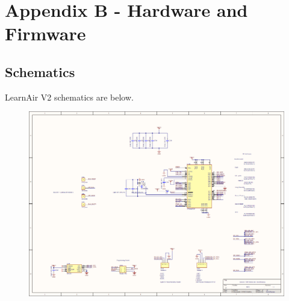 \chapter{Appendix B - Hardware and Firmware}


\section{Schematics}

LearnAir V2 schematics are below.

\FloatBarrier

\begin{figure}[htb]
 	\includegraphics[width=\textwidth + \marginparwidth]{schematics/la_schematic1}               
\end{figure}
